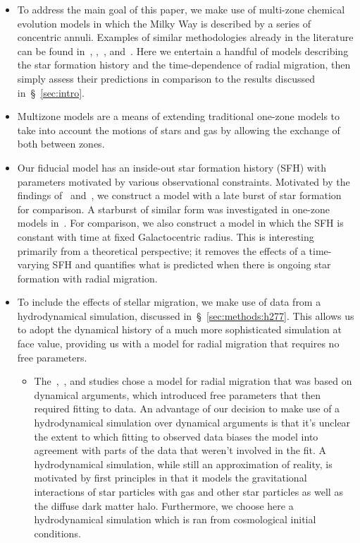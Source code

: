 \documentclass[fleqn, usenatbib]{mnras}
\begin{document}
\begin{itemize} 
	\item To address the main goal of this paper, we make use of multi-zone 
	chemical evolution models in which the Milky Way is described by a series 
	of concentric annuli. Examples of similar methodologies already in 
	the literature can be found in~\citet{Matteucci1989}, 
	\citet{Schoenrich2009},~\citet{Minchev2013}, and~\citet{Sharma2020}. Here 
	we entertain a handful of models describing the star formation history and 
	the time-dependence of radial migration, then simply assess their 
	predictions in comparison to the results discussed in~\S~\ref{sec:intro}. 

	\item Multizone models are a means of extending traditional one-zone 
	models to take into account the motions of stars and gas by allowing the 
	exchange of both between zones. 

	\item Our fiducial model has an inside-out star formation history (SFH) 
	with parameters motivated by various observational constraints. Motivated 
	by the findings of~\citet{Mor2019} and~\citet{Isern2019}, we construct a 
	model with a late burst of star formation for comparison. A starburst of 
	similar form was investigated in one-zone models in~\citet{Johnson2020}. 
	For comparison, we also construct a model in which the SFH is constant 
	with time at fixed Galactocentric radius. This is interesting primarily 
	from a theoretical perspective; it removes the effects of a time-varying 
	SFH and quantifies what is predicted when there is ongoing star formation 
	with radial migration. 

	\item To include the effects of 
	stellar migration, we make use of data from a hydrodynamical simulation, 
	discussed in~\S~\ref{sec:methods:h277}. This allows us to adopt the 
	dynamical history of a much more sophisticated simulation at face value, 
	providing us with a model for radial migration that requires no free 
	parameters. 
	\begin{itemize} 
		\item The~\citet{Schoenrich2009},~\citet{Minchev2013}, and 
		\citet{Sharma2020} studies chose a model for radial migration that 
		was based on dynamical arguments, which introduced free parameters 
		that then required fitting to data. An advantage of our decision to 
		make use of a hydrodynamical simulation over dynamical arguments is 
		that it's unclear the extent to which fitting to observed data biases 
		the model into agreement with parts of the data that weren't involved 
		in the fit. A hydrodynamical simulation, while still an approximation 
		of reality, is motivated by first principles in that it models the 
		gravitational interactions of star particles with gas and other star 
		particles as well as the diffuse dark matter halo. Furthermore, we 
		choose here a hydrodynamical simulation which is ran from cosmological 
		initial conditions. 


\end{itemize}
\end{itemize}
\end{document}
